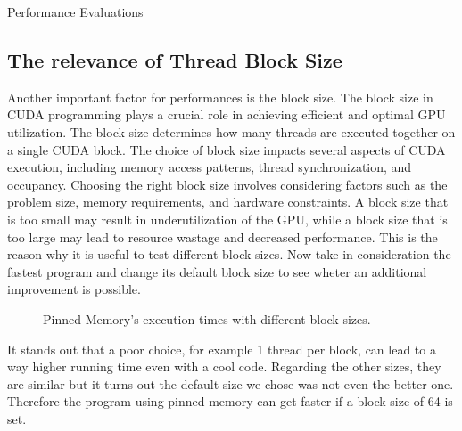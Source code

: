 \documentclass[a4paper,oneside,11pt,DIV12,headsepline,footexclude,headexclude]{scrartcl}
\begin{document}
\begin{section}{Performance Evaluations}
\subsection{The relevance of Thread Block Size}
Another important factor for performances is the block size. The block size in CUDA programming plays a crucial role in achieving efficient and optimal GPU utilization. The block size determines how many threads are executed together on a single CUDA block.
The choice of block size impacts several aspects of CUDA execution, including memory access patterns, thread synchronization, and occupancy. Choosing the right block size involves considering factors such as the problem size, memory requirements, and hardware constraints. A block size that is too small may result in underutilization of the GPU, while a block size that is too large may lead to resource wastage and decreased performance. This is the reason why it is useful to test different block sizes. Now take in consideration the fastest program and change its default block size to see wheter an additional improvement is possible.
\begin{figure}[H]
    \centering
    
    \caption{Pinned Memory's execution times with different block sizes.}
    \label{bs}
\end{figure}
It stands out that a poor choice, for example 1 thread per block, can lead to a way higher running time even with a cool code. Regarding the other sizes, they are similar but it turns out the default size we chose was not even the better one. Therefore the program using pinned memory can get faster if a block size of 64 is set.
\end{section}
\newpage
\end{document}

